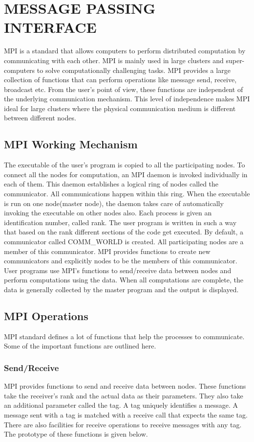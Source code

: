 
\chapter{MESSAGE PASSING INTERFACE}
MPI is a standard that allows computers to perform distributed computation by communicating with each other. MPI is mainly used in large clusters and super-computers to solve computationally challenging tasks. MPI provides a large collection of functions that can perform operations like message send, receive, broadcast etc. From the user's point of view, these functions are independent of the underlying communication mechanism. This level of independence makes MPI ideal for large clusters where the physical communication medium is different between different nodes. 

\section{ MPI Working Mechanism }
    The executable of the user's program is copied to all the participating nodes. To connect all the nodes for computation, an MPI daemon is invoked individually in each of them. This daemon establishes a logical ring of nodes called the communicator. All communications happen within this ring. When the executable is run on one node(master node), the daemon takes care of automatically invoking the executable on other nodes also. Each process is given an identification number, called rank. The user program is written in such a way that based on the rank different sections of the code get executed. By default, a communicator called COMM\_WORLD is created. All participating nodes are a member of this communicator. MPI provides functions to create new communicators and explicitly nodes to be the members of this communicator. User programs use MPI's functions to send/receive data between nodes and perform computations using the data. When all computations are complete, the data is generally collected by the master program and the output is displayed.

\section{ MPI Operations}
    MPI standard defines a lot of functions that help the processes to communicate. Some of the important functions are outlined here.
\subsection{Send/Receive}
    MPI provides functions to send and receive data between nodes. These functions take the receiver's rank and the actual data as their parameters. They also take an additional parameter called the tag. A tag uniquely identifies a message. A message sent with a tag is matched with a receive call that expects the same tag. There are also facilities for receive operations to receive messages with any tag. The prototype of these functions is given below.

